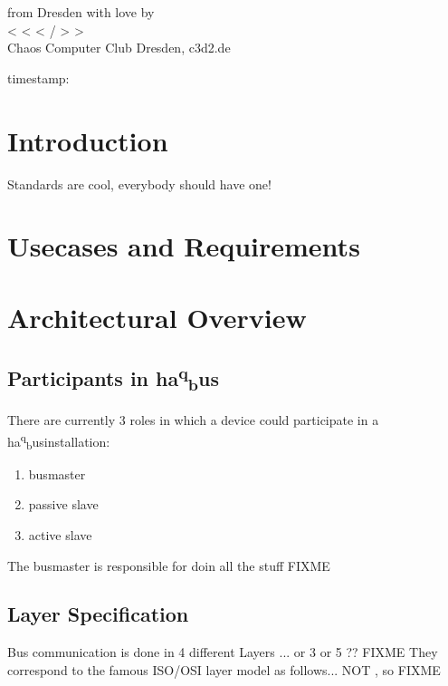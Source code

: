 \documentclass[a4paper,12pt]{scrartcl}
\title{\haqbus}
\author{C3D2}
\date{}
\newcommand{\haqbus}{ha\textsuperscript{q}\textsubscript{b}us}
\begin{document}
\maketitle

\begin{abstract}
This is the first Draft of the haqbus protokoll specification. The haqbus is a field communication system for hackerpsace-automation.
\end{abstract}

\vspace{5cm}
\thispagestyle{empty}
\begin{center}
from Dresden with love by \\
\Large
< < < / > >  \\
\Large
Chaos Computer Club Dresden, c3d2.de 
\end{center}
 timestamp:   
\newpage
\tableofcontents
\newpage
\section{Introduction}
Standards are cool, everybody should have one!


\section{Usecases and Requirements}

\section{Architectural Overview}
\subsection{Participants in \haqbus}
There are currently 3 roles in which a device could participate in a \haqbus installation:
\begin{enumerate}
\item busmaster
\item passive slave
\item active slave
\end{enumerate}
The busmaster is responsible for doin all the stuff FIXME


\subsection{Layer Specification}
Bus communication is done in 4 different Layers ... or 3 or 5 ?? FIXME
They correspond to the famous ISO/OSI layer model as follows... NOT , so FIXME
\end{document}
